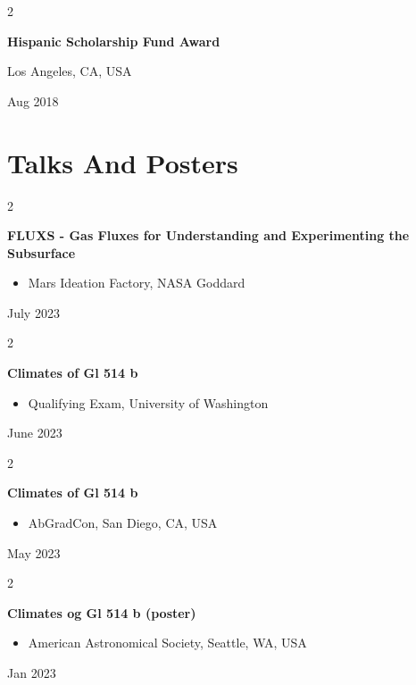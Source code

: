 \documentclass[10pt, letterpaper]{article}
\newenvironment{highlights}{
    \begin{itemize}[
        topsep=0.10 cm,
        parsep=0.10 cm,
        partopsep=0pt,
        itemsep=0pt,
        leftmargin=0.4 cm + 10pt
    ]
}{
    \end{itemize}
} %
\newenvironment{twocolentry}[2][]{
    \onecolentry
    \def\secondColumn{#2}
    \setcolumnwidth{\fill, 4.5 cm}
    \begin{paracol}{2}
}{
    \switchcolumn \raggedleft \secondColumn
    \end{paracol}
    \endonecolentry
} %
\begin{document}
        \vspace{0.2 cm}

        \begin{twocolentry}{
            Los Angeles, CA, USA

        Aug 2018
        }
            \textbf{Hispanic Scholarship Fund Award}
        \end{twocolentry}



    
    \section{Talks And Posters}



        
        \begin{twocolentry}{
            July 2023
        }
            \textbf{FLUXS - Gas Fluxes for Understanding and Experimenting the Subsurface}
            \begin{highlights}
                \item Mars Ideation Factory, NASA Goddard
            \end{highlights}
        \end{twocolentry}


        \vspace{0.2 cm}

        \begin{twocolentry}{
            June 2023
        }
            \textbf{Climates of Gl 514 b}
            \begin{highlights}
                \item Qualifying Exam, University of Washington
            \end{highlights}
        \end{twocolentry}


        \vspace{0.2 cm}

        \begin{twocolentry}{
            May 2023
        }
            \textbf{Climates of Gl 514 b}
            \begin{highlights}
                \item AbGradCon, San Diego, CA, USA
            \end{highlights}
        \end{twocolentry}


        \vspace{0.2 cm}

        \begin{twocolentry}{
            Jan 2023
        }
            \textbf{Climates og Gl 514 b (poster)}
            \begin{highlights}
                \item American Astronomical Society, Seattle, WA, USA
            \end{highlights}
        \end{twocolentry}
\end{document}

